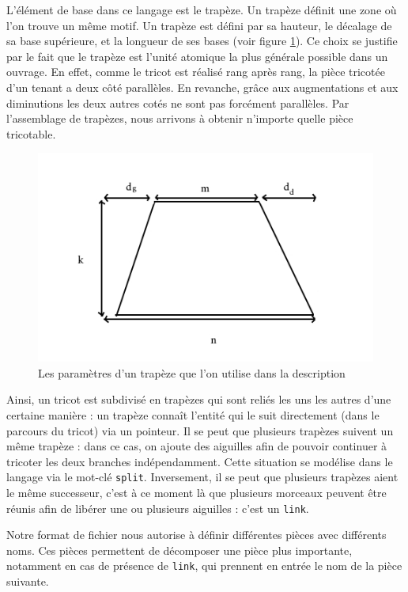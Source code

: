 \documentclass{article}
\begin{document}
L'élément de base dans ce langage est le trapèze. Un trapèze définit
une zone où l'on trouve un même motif. Un trapèze est défini par sa
hauteur, le décalage de sa base supérieure, et la longueur de ses
bases (voir figure \ref{trapeze}). Ce choix se justifie par le fait
que le trapèze est l'unité atomique la plus générale possible dans un
ouvrage. En effet, comme le tricot est réalisé rang après rang, la pièce
tricotée d'un tenant a deux côté parallèles. En revanche, grâce aux 
augmentations et aux diminutions les deux autres cotés ne sont pas 
forcément parallèles. Par l'assemblage de trapèzes, nous arrivons
à obtenir n'importe quelle pièce tricotable.

\begin{figure}[!ht]
  \centering \includegraphics[scale=0.5]{../img/trapeze.jpg}
  \caption{Les paramètres d'un trapèze que l'on utilise dans la
    description}
  \label{trapeze}
\end{figure}

Ainsi, un tricot est subdivisé en trapèzes qui sont reliés les uns les autres
d'une certaine manière : un trapèze connaît l'entité qui le suit
directement (dans le parcours du tricot) via un pointeur. Il se peut
que plusieurs trapèzes suivent un même trapèze : dans ce cas, on 
ajoute des aiguilles afin de pouvoir continuer à tricoter les deux branches 
indépendamment. Cette situation se modélise
dans le langage via le mot-clé \texttt{split}.  Inversement, il se
peut que plusieurs trapèzes aient le même successeur, c'est à ce
moment là que plusieurs morceaux peuvent être réunis afin de libérer
une ou plusieurs aiguilles : c'est un \texttt{link}.

Notre format de fichier nous autorise à définir différentes pièces
avec différents noms. Ces pièces permettent de décomposer une pièce plus importante,
notamment en cas de présence de \texttt{link}, qui prennent en entrée
le nom de la pièce suivante.
\end{document}
